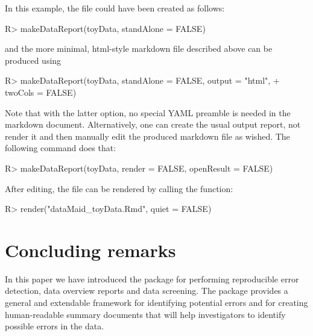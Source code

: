 \documentclass[article,shortnames]{jss}
\begin{document}
In this example, the  file could have
been created as follows:

\begin{Schunk}
\begin{Sinput}
R> makeDataReport(toyData, standAlone = FALSE)
\end{Sinput}
\end{Schunk}

and the more minimal, html-style  markdown file described above can be produced using

\begin{Schunk}
\begin{Sinput}
R> makeDataReport(toyData, standAlone = FALSE, output = "html", 
+    twoCols = FALSE)
\end{Sinput}
\end{Schunk}

Note that with the latter option, no special YAML preamble is needed in the  markdown document. 
%
Alternatively, one can create the usual output report, not render it and then manually edit the produced  markdown file as wished. The following command does that:

\begin{Schunk}
\begin{Sinput}
R> makeDataReport(toyData, render = FALSE, openResult = FALSE)
\end{Sinput}
\end{Schunk}

After editing, the file can be rendered by calling the  function:

\begin{Schunk}
\begin{Sinput}
R> render("dataMaid_toyData.Rmd", quiet = FALSE)
\end{Sinput}
\end{Schunk}


\section{Concluding remarks}
\label{conclusion}

In this paper we have introduced the  package
 for performing reproducible error detection, data
overview reports and data screening. The package provides a general and
extendable framework for identifying potential errors and for creating
human-readable summary documents that will help investigators to
identify possible errors in the data.
\end{document}
